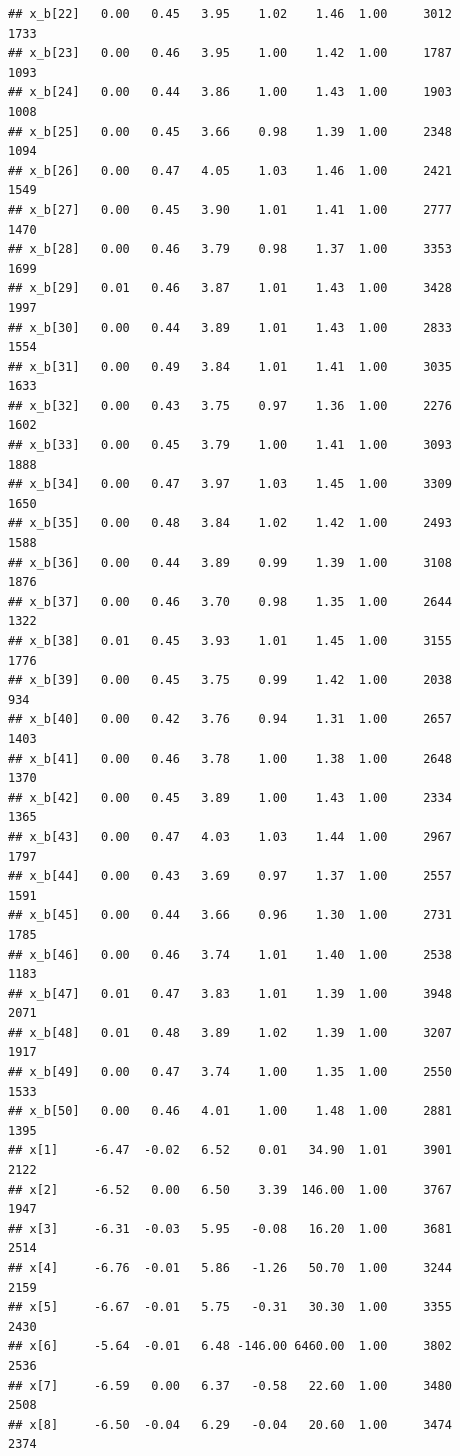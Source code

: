 \documentclass[american,]{article}
\begin{document}
\begin{verbatim}
## x_b[22]   0.00   0.45   3.95    1.02    1.46  1.00     3012     1733
## x_b[23]   0.00   0.46   3.95    1.00    1.42  1.00     1787     1093
## x_b[24]   0.00   0.44   3.86    1.00    1.43  1.00     1903     1008
## x_b[25]   0.00   0.45   3.66    0.98    1.39  1.00     2348     1094
## x_b[26]   0.00   0.47   4.05    1.03    1.46  1.00     2421     1549
## x_b[27]   0.00   0.45   3.90    1.01    1.41  1.00     2777     1470
## x_b[28]   0.00   0.46   3.79    0.98    1.37  1.00     3353     1699
## x_b[29]   0.01   0.46   3.87    1.01    1.43  1.00     3428     1997
## x_b[30]   0.00   0.44   3.89    1.01    1.43  1.00     2833     1554
## x_b[31]   0.00   0.49   3.84    1.01    1.41  1.00     3035     1633
## x_b[32]   0.00   0.43   3.75    0.97    1.36  1.00     2276     1602
## x_b[33]   0.00   0.45   3.79    1.00    1.41  1.00     3093     1888
## x_b[34]   0.00   0.47   3.97    1.03    1.45  1.00     3309     1650
## x_b[35]   0.00   0.48   3.84    1.02    1.42  1.00     2493     1588
## x_b[36]   0.00   0.44   3.89    0.99    1.39  1.00     3108     1876
## x_b[37]   0.00   0.46   3.70    0.98    1.35  1.00     2644     1322
## x_b[38]   0.01   0.45   3.93    1.01    1.45  1.00     3155     1776
## x_b[39]   0.00   0.45   3.75    0.99    1.42  1.00     2038      934
## x_b[40]   0.00   0.42   3.76    0.94    1.31  1.00     2657     1403
## x_b[41]   0.00   0.46   3.78    1.00    1.38  1.00     2648     1370
## x_b[42]   0.00   0.45   3.89    1.00    1.43  1.00     2334     1365
## x_b[43]   0.00   0.47   4.03    1.03    1.44  1.00     2967     1797
## x_b[44]   0.00   0.43   3.69    0.97    1.37  1.00     2557     1591
## x_b[45]   0.00   0.44   3.66    0.96    1.30  1.00     2731     1785
## x_b[46]   0.00   0.46   3.74    1.01    1.40  1.00     2538     1183
## x_b[47]   0.01   0.47   3.83    1.01    1.39  1.00     3948     2071
## x_b[48]   0.01   0.48   3.89    1.02    1.39  1.00     3207     1917
## x_b[49]   0.00   0.47   3.74    1.00    1.35  1.00     2550     1533
## x_b[50]   0.00   0.46   4.01    1.00    1.48  1.00     2881     1395
## x[1]     -6.47  -0.02   6.52    0.01   34.90  1.01     3901     2122
## x[2]     -6.52   0.00   6.50    3.39  146.00  1.00     3767     1947
## x[3]     -6.31  -0.03   5.95   -0.08   16.20  1.00     3681     2514
## x[4]     -6.76  -0.01   5.86   -1.26   50.70  1.00     3244     2159
## x[5]     -6.67  -0.01   5.75   -0.31   30.30  1.00     3355     2430
## x[6]     -5.64  -0.01   6.48 -146.00 6460.00  1.00     3802     2536
## x[7]     -6.59   0.00   6.37   -0.58   22.60  1.00     3480     2508
## x[8]     -6.50  -0.04   6.29   -0.04   20.60  1.00     3474     2374

\end{verbatim}
\end{document}
